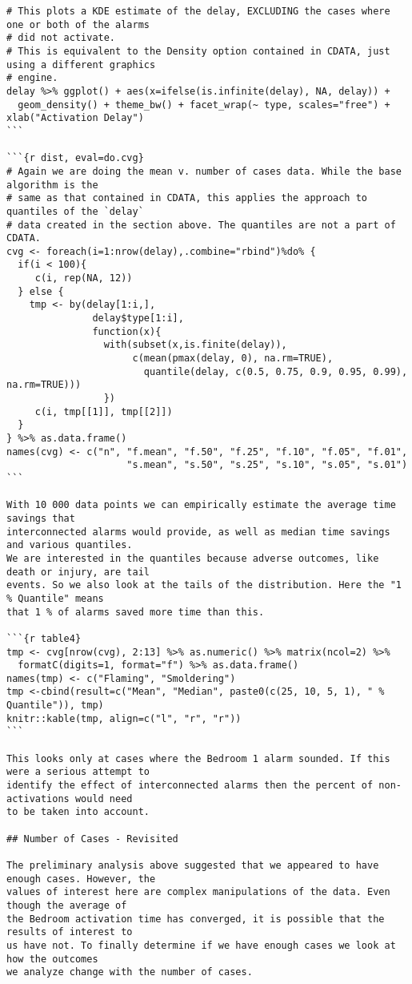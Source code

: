 \begin{lstlisting}[basicstyle=\scriptsize]
# This plots a KDE estimate of the delay, EXCLUDING the cases where one or both of the alarms
# did not activate.
# This is equivalent to the Density option contained in CDATA, just using a different graphics
# engine.
delay %>% ggplot() + aes(x=ifelse(is.infinite(delay), NA, delay)) +
  geom_density() + theme_bw() + facet_wrap(~ type, scales="free") + xlab("Activation Delay")
```

```{r dist, eval=do.cvg}
# Again we are doing the mean v. number of cases data. While the base algorithm is the
# same as that contained in CDATA, this applies the approach to quantiles of the `delay`
# data created in the section above. The quantiles are not a part of CDATA.
cvg <- foreach(i=1:nrow(delay),.combine="rbind")%do% {
  if(i < 100){
     c(i, rep(NA, 12))
  } else {
    tmp <- by(delay[1:i,],
               delay$type[1:i],
               function(x){
                 with(subset(x,is.finite(delay)),
                      c(mean(pmax(delay, 0), na.rm=TRUE),
                        quantile(delay, c(0.5, 0.75, 0.9, 0.95, 0.99), na.rm=TRUE)))
                 })
     c(i, tmp[[1]], tmp[[2]])
  }
} %>% as.data.frame()
names(cvg) <- c("n", "f.mean", "f.50", "f.25", "f.10", "f.05", "f.01",
                     "s.mean", "s.50", "s.25", "s.10", "s.05", "s.01")
```

With 10 000 data points we can empirically estimate the average time savings that
interconnected alarms would provide, as well as median time savings and various quantiles.
We are interested in the quantiles because adverse outcomes, like death or injury, are tail
events. So we also look at the tails of the distribution. Here the "1 % Quantile" means
that 1 % of alarms saved more time than this.

```{r table4}
tmp <- cvg[nrow(cvg), 2:13] %>% as.numeric() %>% matrix(ncol=2) %>%
  formatC(digits=1, format="f") %>% as.data.frame()
names(tmp) <- c("Flaming", "Smoldering")
tmp <-cbind(result=c("Mean", "Median", paste0(c(25, 10, 5, 1), " % Quantile")), tmp)
knitr::kable(tmp, align=c("l", "r", "r"))
```

This looks only at cases where the Bedroom 1 alarm sounded. If this were a serious attempt to
identify the effect of interconnected alarms then the percent of non-activations would need
to be taken into account.

## Number of Cases - Revisited

The preliminary analysis above suggested that we appeared to have enough cases. However, the
values of interest here are complex manipulations of the data. Even though the average of
the Bedroom activation time has converged, it is possible that the results of interest to
us have not. To finally determine if we have enough cases we look at how the outcomes
we analyze change with the number of cases.


\end{lstlisting}
